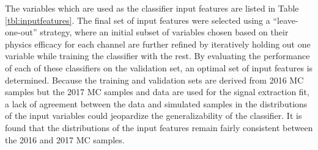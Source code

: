The variables which are used as the classifier input features are listed in Table \ref{tbl:inputfeatures}. The final set of input features were selected using a ``leave-one-out'' strategy, where an initial subset of variables chosen based on their physics efficacy for each channel are further refined by iteratively holding out one variable while training the classifier with the rest. By evaluating the performance of each of these classifiers on the validation set, an optimal set of input features is determined. Because the training and validation sets are derived from 2016 MC samples but the 2017 MC samples and data are used for the signal extraction fit, a lack of agreement between the data and simulated samples in the distributions of the input variables could jeopardize the generalizability of the classifier. It is found that the distributions of the input features remain fairly consistent between the 2016 and 2017 MC samples.

